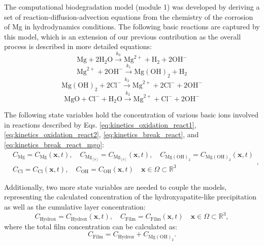 The computational biodegradation model (module 1) was developed by deriving a set of reaction-diffusion-advection equations from the chemistry of the corrosion of Mg in hydrodynamics conditions. The following basic reactions are captured by this model, which is an extension of our previous contribution \cite{Barzegari2021} as the overall process is described in more detailed equations:
\begin{equation} \label{eq:kinetics_oxidation_react1}
\mathrm{Mg}+2 \mathrm{H}_{2} \mathrm{O} \stackrel{k_{0}}{\rightarrow} \mathrm{Mg}^{2+}+\mathrm{H}_{2}+2 \mathrm{OH}^{-}
\end{equation}
\begin{equation} \label{eq:kinetics_oxidation_react2}
\mathrm{Mg}^{2+}+2 \mathrm{OH}^{-} \stackrel{k_{1}}{\rightarrow} \mathrm{Mg}(\mathrm{OH})_{2}+\mathrm{H}_{2}
\end{equation}
\begin{equation} \label{eq:kinetics_break_react}
\mathrm{Mg}(\mathrm{OH})_{2}+2 \mathrm{Cl}^{-} \stackrel{k_{2}}{\rightarrow} \mathrm{Mg}^{2+}+2 \mathrm{Cl}^{-}+2 \mathrm{OH}^{-}
\end{equation}
\begin{equation} \label{eq:kinetics_break_react_mgo}
\mathrm{MgO}+ \mathrm{Cl}^{-} + \mathrm{H}_{2} \mathrm{O} \stackrel{k_{2}}{\rightarrow} \mathrm{Mg}^{2+}+ \mathrm{Cl}^{-}+ 2\mathrm{OH}^{-}
\end{equation}

The following state variables hold the concentration of various basic ions involved in reactions described by Eqs. \ref{eq:kinetics_oxidation_react1}, \ref{eq:kinetics_oxidation_react2}, \ref{eq:kinetics_break_react}, and \ref{eq:kinetics_break_react_mgo}:
\begin{equation} \label{eq:kinetics_state_vars_film}
\begin{aligned}
&C_{\mathrm{Mg}} = C_{\mathrm{Mg}}(\mathbf{x},t), \quad C_{\mathrm{Mg}_\mathrm{[s]}} = C_{\mathrm{Mg}_\mathrm{[s]}}(\mathbf{x},t), \quad C_{\mathrm{Mg}(\mathrm{OH})_{2}} = C_{\mathrm{Mg}(\mathrm{OH})_{2}}(\mathbf{x},t)  \\
&C_{\mathrm{Cl}} = C_{\mathrm{Cl}}(\mathbf{x},t), \quad C_{\mathrm{OH}} = C_{\mathrm{OH}}(\mathbf{x},t) \quad \mathbf{x} \in \Omega \subset \mathbb{R}^{3}
\end{aligned},
\end{equation}

Additionally, two more state variables are needed to couple the models, representing the calculated concentration of the hydroxyapatite-like precipitation as well as the cumulative layer concentration:
\begin{equation} \label{eq:kinetics_state_vars}
C_{\mathrm{Hydrox}} = C_{\mathrm{Hydrox}}(\mathbf{x},t), \quad C_{\mathrm{Film}} = C_{\mathrm{Film}}(\mathbf{x},t) \quad \mathbf{x} \in \Omega \subset \mathbb{R}^{3},
\end{equation}
where the total film concentration can be calculated as:
\begin{equation} \label{eq:kinetics_film_cumulative}
C_{\mathrm{Film}} = C_{\mathrm{Hydrox}} + C_{\mathrm{\mathrm{Mg}(\mathrm{OH})_{2}}}.
\end{equation}

